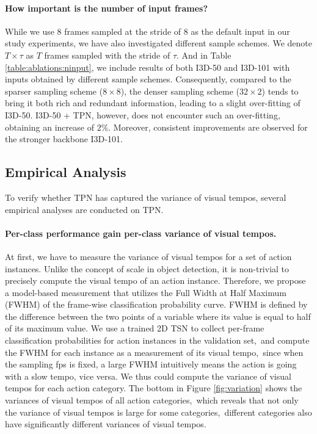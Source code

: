 \documentclass[10pt,twocolumn,letterpaper]{article}
\begin{document}
\paragraph{How important is the number of input frames?}
While we use 8 frames sampled at the stride of 8 as the default input in our study experiments, we have also investigated different sample schemes.
We denote $T\times \tau$ as $T$ frames sampled with the stride of $\tau$.
And in Table \ref{table:ablations:ninput}, we include results of both I3D-50 and I3D-101 with inputs obtained by different sample schemes.
Consequently, compared to the sparser sampling scheme ($8 \times 8$), the denser sampling scheme ($32 \times 2$) tends to bring it both rich and redundant information, leading to a slight over-fitting of I3D-50.
I3D-50 + TPN, however, does not encounter such an over-fitting, obtaining an increase of $2\%$.
Moreover, consistent improvements are observed for the stronger backbone I3D-101.


\subsection{Empirical Analysis}\label{subsec:verifcation}
To verify whether TPN has captured the variance of visual tempos,
several empirical analyses are conducted on TPN.


\paragraph{Per-class performance gain \vs per-class variance of visual tempos.}
At first, we have to measure the variance of visual tempos for a set of action instances.
Unlike the concept of scale in object detection, it is non-trivial to precisely compute the visual tempo of an action instance.
Therefore, we propose a model-based measurement that utilizes the Full Width at Half Maximum (FWHM) of the frame-wise classification probability curve.
FWHM is defined by the difference between the two points of a variable where its value is equal to half of its maximum value.
We use a trained 2D TSN to collect per-frame classification probabilities for action instances in the validation set,\
and compute the FWHM for each instance as a measurement of its visual tempo,\
since when the sampling fps is fixed, a large FWHM intuitively means the action is going with a slow tempo, vice versa.
We thus could compute the variance of visual tempos for each action category.
The bottom in Figure \ref{fig:variation} shows the variances of visual tempos of all action categories,\
which reveals that not only the variance of visual tempos is large for some categories,\ 
different categories also have significantly different variances of visual tempos.
\end{document}
